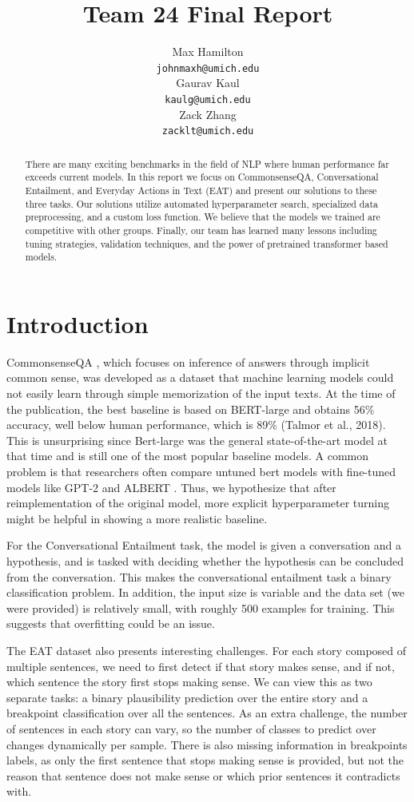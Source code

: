 \documentclass[11pt,a4paper]{article}
\title{Team 24 Final Report}
\author{Max Hamilton \\
  \texttt{johnmaxh@umich.edu} \\\And
  Gaurav Kaul \\
  \texttt{kaulg@umich.edu} \\\And
  Zack Zhang \\
  \texttt{zacklt@umich.edu} \\}
\begin{document}
\maketitle

\begin{abstract}
There are many exciting benchmarks in the field of NLP where human performance far exceeds current models. In this report we focus on CommonsenseQA, Conversational Entailment, and Everyday Actions in Text (EAT) and present our solutions to these three tasks. Our solutions utilize automated hyperparameter search, specialized data preprocessing, and a custom loss function. We believe that the models we trained are competitive with other groups. Finally, our team has learned many lessons including tuning strategies, validation techniques, and the power of pretrained transformer based models.
\end{abstract}
\section{Introduction}
CommonsenseQA \citep{talmor2019commonsenseqa}, which focuses on inference of answers through implicit common sense, was developed as a dataset that machine learning models could not easily learn through simple memorization of the input texts. At the time of the publication, the best baseline is based on BERT-large \citep{devlin2019bert} and obtains 56\% accuracy, well below human performance, which is 89\% (Talmor et al., 2018). This is unsurprising since Bert-large was the general state-of-the-art model at that time and is still one of the most popular baseline models. A common problem is that researchers often compare untuned bert models with fine-tuned models like GPT-2 \citep{radford2019language} and ALBERT \citep{lan2020albert}. Thus, we hypothesize that after reimplementation of the original model, more explicit hyperparameter turning might be helpful in showing a more realistic baseline.

For the Conversational Entailment \citep{zhang-chai-2010-towards} task, the model is given a conversation and a hypothesis, and is tasked with deciding whether the hypothesis can be concluded from the conversation. This makes the conversational entailment task a binary classification problem. In addition, the input size is variable and the data set (we were provided) is relatively small, with roughly 500 examples for training. This suggests that overfitting could be an issue.

The EAT dataset also presents interesting challenges. For each story composed of multiple sentences, we need to first detect if that story makes sense, and if not, which sentence the story first stops making sense. We can view this as two separate tasks: a binary plausibility prediction over the entire story and a breakpoint classification over all the sentences. As an extra challenge, the number of sentences in each story can vary, so the number of classes to predict over changes dynamically per sample. There is also missing information in breakpoints labels, as only the first sentence that stops making sense is provided, but not the reason that sentence does not make sense or which prior sentences it contradicts with. 
\end{document}
